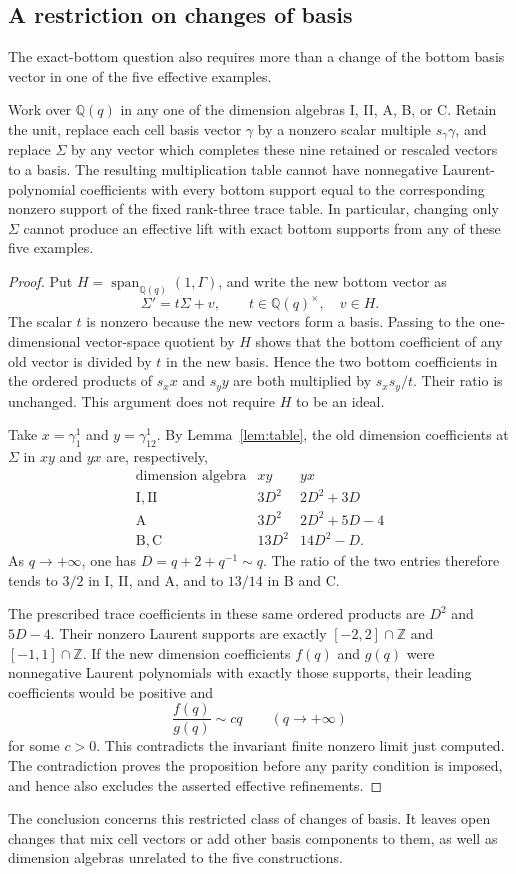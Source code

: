 \subsection{A restriction on changes of basis}\label{sec:rescaling-obstruction}
The exact-bottom question also requires more than a change of the bottom basis vector in one of the five effective examples.

\begin{proposition}\label{prop:rescaling-obstruction}
Work over $\mathbb Q(q)$ in any one of the dimension algebras I, II, A, B, or C. Retain the unit, replace each cell basis vector $\gamma$ by a nonzero scalar multiple $s_\gamma\gamma$, and replace $\Sigma$ by any vector which completes these nine retained or rescaled vectors to a basis. The resulting multiplication table cannot have nonnegative Laurent-polynomial coefficients with every bottom support equal to the corresponding nonzero support of the fixed rank-three trace table. In particular, changing only $\Sigma$ cannot produce an effective lift with exact bottom supports from any of these five examples.
\end{proposition}

\begin{proof}
Put $H=\operatorname{span}_{\mathbb Q(q)}(1,\Gamma)$, and write the new bottom vector as
\[
 \Sigma'=t\Sigma+v,\qquad t\in\mathbb Q(q)^\times,\quad v\in H.
\]
The scalar $t$ is nonzero because the new vectors form a basis. Passing to the one-dimensional vector-space quotient by $H$ shows that the bottom coefficient of any old vector is divided by $t$ in the new basis. Hence the two bottom coefficients in the ordered products of $s_xx$ and $s_yy$ are both multiplied by $s_xs_y/t$. Their ratio is unchanged. This argument does not require $H$ to be an ideal.

Take $x=\gamma_1^1$ and $y=\gamma_{12}^1$. By Lemma~\ref{lem:table}, the old dimension coefficients at $\Sigma$ in $xy$ and $yx$ are, respectively,
\[
 \begin{array}{c|cc}
 \text{dimension algebra}&xy&yx\\ \hline
 \mathrm I,\mathrm{II}&3D^2&2D^2+3D\\
 \mathrm A&3D^2&2D^2+5D-4\\
 \mathrm B,\mathrm C&13D^2&14D^2-D.
 \end{array}
\]
As $q\to+\infty$, one has $D=q+2+q^{-1}\sim q$. The ratio of the two entries therefore tends to $3/2$ in I, II, and A, and to $13/14$ in B and C.

The prescribed trace coefficients in these same ordered products are $D^2$ and $5D-4$. Their nonzero Laurent supports are exactly $[-2,2]\cap\mathbb Z$ and $[-1,1]\cap\mathbb Z$. If the new dimension coefficients $f(q)$ and $g(q)$ were nonnegative Laurent polynomials with exactly those supports, their leading coefficients would be positive and
\[
 \frac{f(q)}{g(q)}\sim c q\qquad(q\to+\infty)
\]
for some $c>0$. This contradicts the invariant finite nonzero limit just computed. The contradiction proves the proposition before any parity condition is imposed, and hence also excludes the asserted effective refinements.
\end{proof}

The conclusion concerns this restricted class of changes of basis. It leaves open changes that mix cell vectors or add other basis components to them, as well as dimension algebras unrelated to the five constructions.
